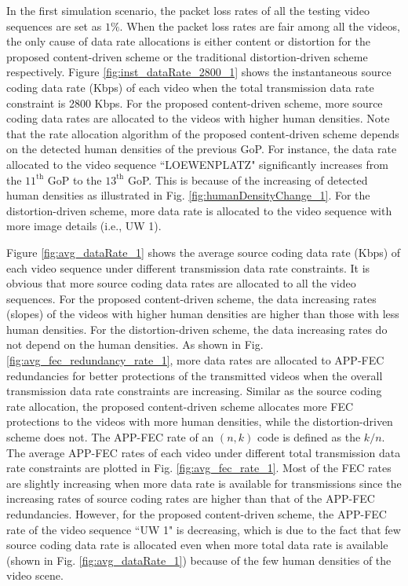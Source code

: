 \documentclass[journal]{IEEEtran}
\begin{document}
In the first simulation scenario, the packet loss rates of all the testing video sequences are set as $1\%$. When the packet loss rates are fair among all the videos, the only cause of data rate allocations is either content or distortion for the proposed content-driven scheme or the traditional distortion-driven scheme respectively. Figure \ref{fig:inst_dataRate_2800_1} shows the instantaneous source coding data rate (Kbps) of each video when the total transmission data rate constraint is 2800 Kbps. For the proposed content-driven scheme, more source coding data rates are allocated to the videos with higher human densities. Note that the rate allocation algorithm of the proposed content-driven scheme depends on the detected human densities of the previous GoP. For instance, the data rate allocated to the video sequence ``LOEWENPLATZ" significantly increases from the $11^\text{th}$ GoP to the $13^\text{th}$ GoP. This is because of the increasing of detected human densities as illustrated in Fig. \ref{fig:humanDensityChange_1}. For the distortion-driven scheme, more data rate is allocated to the video sequence with more image details (i.e., UW 1).

Figure \ref{fig:avg_dataRate_1} shows the average source coding data rate (Kbps) of each video sequence under different transmission data rate constraints. It is obvious that more source coding data rates are allocated to all the video sequences. For the proposed content-driven scheme, the data increasing rates (slopes) of the videos with higher human densities are higher than those with less human densities. For the distortion-driven scheme, the data increasing rates do not depend on the human densities. As shown in Fig. \ref{fig:avg_fec_redundancy_rate_1}, more data rates are allocated to APP-FEC redundancies for better protections of the transmitted videos when the overall transmission data rate constraints are increasing. Similar as the source coding rate allocation, the proposed content-driven scheme allocates more FEC protections to the videos with more human densities, while the distortion-driven scheme does not. The APP-FEC rate of an $\left(n,k\right)$ code is defined as the $k/n$. The average APP-FEC rates of each video under different total transmission data rate constraints are plotted in Fig. \ref{fig:avg_fec_rate_1}. Most of the FEC rates are slightly increasing when more data rate is available for transmissions since the increasing rates of source coding rates are higher than that of the APP-FEC redundancies. However, for the proposed content-driven scheme, the APP-FEC rate of the video sequence ``UW 1" is decreasing, which is due to the fact that few source coding data rate is allocated even when more total data rate is available (shown in Fig. \ref{fig:avg_dataRate_1}) because of the few human densities of the video scene.
\end{document}
